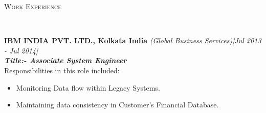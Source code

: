 \documentclass[a4paper,10pt]{article}
\newenvironment{changemargin}[2]{%
	\begin{list}{}{%
			\setlength{\topsep}{0pt}%
			\setlength{\leftmargin}{#1}%
			\setlength{\rightmargin}{#2}%
			\setlength{\listparindent}{\parindent}%
			\setlength{\parsep}{\parskip}%
		}%
		\item[]}{\end{list}
}
\newcommand{\lineover}{
	\begin{changemargin}{-0.0in}{-0.0in}
		\vspace*{-8pt}
		\hrulefill \\
		\vspace*{-2pt}
	\end{changemargin}
}
\newcommand{\header}[1]{
	\begin{changemargin}{-0.0in}{-0.0in}
		\large	\scshape {#1}\\	
		\lineover
	\end{changemargin}
}
\newenvironment{body} {
	\vspace*{-16pt}
	\begin{changemargin}{-0.0in}{-0.in}
	}	
	{\end{changemargin}
}
\begin{document}
\begin{body}
\begin{itemize}
		\end{itemize}
		
		
		
	\end{body}
	
	
	 
	
	\vspace{-1ex}
	\header{Work Experience}
	\vspace{-0.5ex}
	\begin{body}
		\vspace{14pt}
		
		\setlength{\itemindent}{0em}
		
		
		\textbf{IBM INDIA PVT. LTD., Kolkata India} \emph{(Global Business Services)}\hfill \emph{[Jul 2013 - Jul 2014]} \\
		\emph{\textbf{Title:- Associate System Engineer}}\\
		\vspace{-0.5ex}
		Responsibilities in this role included:
		\vspace{-1ex}
		\begin{itemize}
			\setlength{\itemindent}{0em}
			\item Monitoring Data flow within Legacy Systems.
			\vspace{-1ex}
			\item Maintaining data consistency in Customer's Financial Database. 
		\end{itemize}
		
		
		
		
	\end{body}
	
\end{document}
